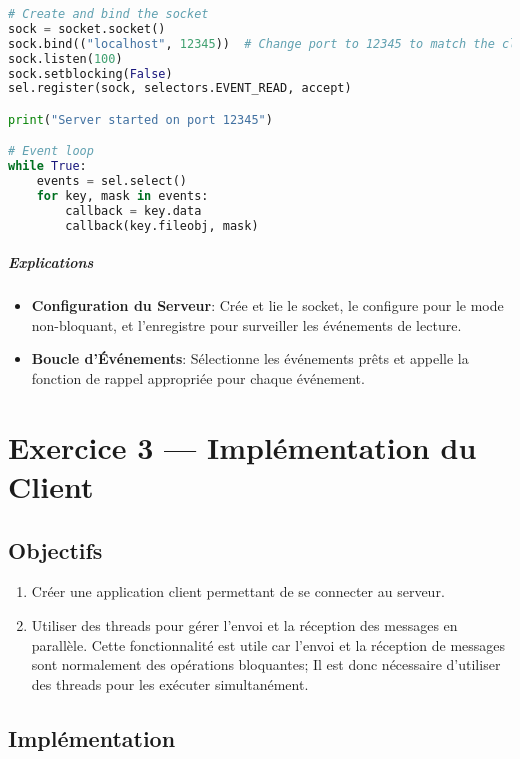 \documentclass{article}
\begin{document}
\begin{lstlisting}[language=Python, caption=Configuration du serveur et boucle d'événements dans serv.py]
# Create and bind the socket
sock = socket.socket()
sock.bind(("localhost", 12345))  # Change port to 12345 to match the client
sock.listen(100)
sock.setblocking(False)
sel.register(sock, selectors.EVENT_READ, accept)

print("Server started on port 12345")

# Event loop
while True:
    events = sel.select()
    for key, mask in events:
        callback = key.data
        callback(key.fileobj, mask)
\end{lstlisting}

\subparagraph{Explications}

\begin{itemize}
    \item \textbf{Configuration du Serveur}: Crée et lie le socket, le configure pour le mode non-bloquant, et l'enregistre pour surveiller les événements de lecture.
    \item \textbf{Boucle d'Événements}: Sélectionne les événements prêts et appelle la fonction de rappel appropriée pour chaque événement.
\end{itemize}

\break\section{Exercice 3 — Implémentation du Client}

\subsection{Objectifs}

\begin{enumerate}
    \item Créer une application client permettant de se connecter au serveur.
    \item Utiliser des threads pour gérer l'envoi et la réception des messages en parallèle. Cette fonctionnalité est utile car l'envoi et la réception de messages sont normalement des opérations bloquantes; Il est donc nécessaire d'utiliser des threads pour les exécuter simultanément.
\end{enumerate}

\subsection{Implémentation}
\end{document}
